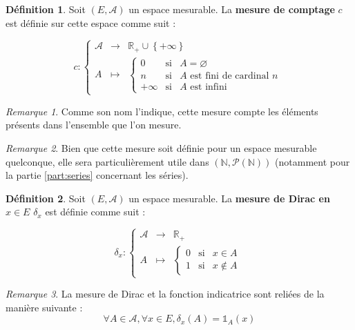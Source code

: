 \documentclass[french]{report}
\theoremstyle{plain}
\theoremstyle{definition}
\newtheorem{defi}{Définition}[section]
\theoremstyle{remark}
\newtheorem{rem}{Remarque}[section]
\begin{document}
\begin{defi}
  Soit $\left(E,\mathcal{A}\right)$ un espace mesurable.
  La \textbf{mesure de comptage} $c$ est définie sur cette espace comme suit :
  
  $$
    c : 
  \left\{
  \begin{array}{ccc}
    \mathcal{A} & \longrightarrow & \mathbb{R}_+\cup\left\{+\infty\right\}\\
    A &                                   \longmapsto    &  
      \left\{
      \begin{array}{rcl}
        0 & \text{si} & A = \varnothing\\
        n & \text{si} & A \text{ est fini de cardinal } n\\
        +\infty & \text{si} & A \text{ est infini}
      \end{array}
      \right.
  \end{array}
  \right.
  $$
\end{defi}

\begin{rem}
  Comme son nom l'indique, cette mesure compte les éléments présents dans l'ensemble que l'on mesure.
\end{rem}

\begin{rem}
  Bien que cette mesure soit définie pour un espace mesurable quelconque, elle sera particulièrement utile dans $\left(\mathbb{N},\mathcal{P}\left(\mathbb{N}\right)\right)$ (notamment pour la partie \ref{part:series} concernant les séries).
\end{rem}


\begin{defi}
  Soit $\left(E,\mathcal{A}\right)$ un espace mesurable.
  La \textbf{mesure de Dirac en $x \in E$} $\delta_x$ est définie comme suit :

  $$
    \delta_x : 
  \left\{
  \begin{array}{ccc}
    \mathcal{A} & \longrightarrow & \mathbb{R}_+\\
    A &                                   \longmapsto    &  
      \left\{
      \begin{array}{rcl}
        0 & \text{si} & x \in A\\
        1 & \text{si} & x \notin A
      \end{array}
      \right.
  \end{array}
  \right.
  $$
\end{defi}

\begin{rem}
  La mesure de Dirac et la fonction indicatrice sont reliées de la manière suivante :
  $$
  \forall A \in \mathcal{A}, \forall x \in E, \delta_x(A)=\mathds{1}_A(x)
  $$
\end{rem}
\end{document}
